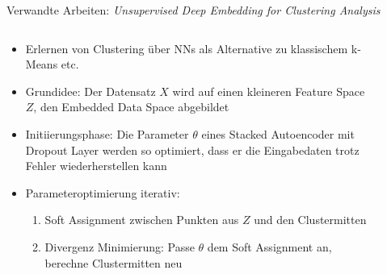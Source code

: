\documentclass[9pt]{beamer}
\begin{document}
\begin{frame}{Verwandte Arbeiten: \textit{Unsupervised Deep Embedding for Clustering Analysis}\footnotemark[1]}
	\begin{columns}
		\begin{column}{.8\textwidth}
			\begin{itemize}
				\item Erlernen von Clustering über NNs als Alternative zu klassischem k-Means etc.
				\item Grundidee: Der Datensatz $X$ wird auf einen kleineren Feature Space $Z$, den Embedded Data Space abgebildet
				\item Initiierungsphase: Die Parameter $\theta$ eines Stacked Autoencoder mit Dropout Layer werden so optimiert, dass er die Eingabedaten trotz Fehler wiederherstellen kann
				\item Parameteroptimierung iterativ:
				\begin{enumerate}
					\item Soft Assignment zwischen Punkten aus $Z$ und den Clustermitten
					\item Divergenz Minimierung: Passe $\theta$ dem Soft Assignment an, berechne Clustermitten neu
				\end{enumerate}
			\end{itemize}
		\end{column}
		\begin{column}{.2\textwidth}
			\begin{figure}
				
			\end{figure}
		\end{column}
	\end{columns}
\end{frame}
\end{document}
